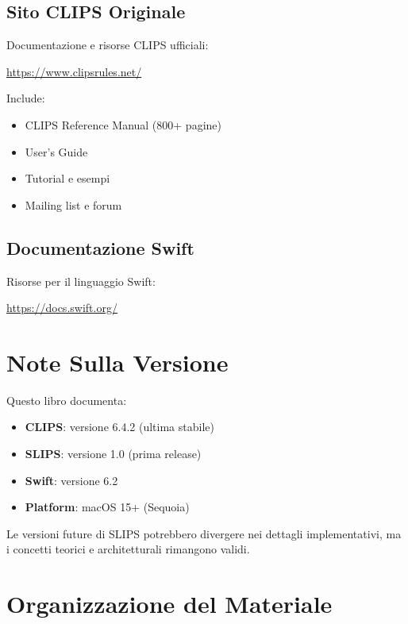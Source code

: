 \subsection{Sito CLIPS Originale}

Documentazione e risorse CLIPS ufficiali:

\begin{center}
\url{https://www.clipsrules.net/}
\end{center}

Include:
\begin{itemize}
\item CLIPS Reference Manual (800+ pagine)
\item User's Guide
\item Tutorial e esempi
\item Mailing list e forum
\end{itemize}

\subsection{Documentazione Swift}

Risorse per il linguaggio Swift:

\begin{center}
\url{https://docs.swift.org/}
\end{center}

\section{Note Sulla Versione}

Questo libro documenta:

\begin{itemize}
\item \textbf{CLIPS}: versione 6.4.2 (ultima stabile)
\item \textbf{SLIPS}: versione 1.0 (prima release)
\item \textbf{Swift}: versione 6.2
\item \textbf{Platform}: macOS 15+ (Sequoia)
\end{itemize}

Le versioni future di SLIPS potrebbero divergere nei dettagli implementativi, ma i concetti teorici e architetturali rimangono validi.

\section{Organizzazione del Materiale}

